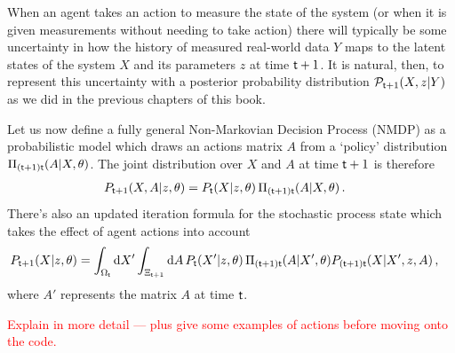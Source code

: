 When an agent takes an action to measure the state of the system (or when it is given measurements without needing to take action) there will typically be some uncertainty in how the history of measured real-world data $Y$ maps to the latent states of the system $X$ and its parameters $z$ at time ${\sf t}+1$. It is natural, then, to represent this uncertainty with a posterior probability distribution ${\cal P}_{{\sf t}+1}(X,z\vert Y)$ as we did in the previous chapters of this book. 

Let us now define a fully general Non-Markovian Decision Process (NMDP) as a probabilistic model which draws an actions matrix $A$ from a `policy' distribution $\Pi_{({\sf t}+1){\sf t}}(A\vert X,\theta)$. The joint distribution over $X$ and $A$ at time ${\sf t}+1$ is therefore
\begin{align}
P_{{\sf t}+1}(X,A\vert z, \theta ) &= P_{{\sf t}}(X\vert z,\theta ) \,\Pi_{({\sf t}+1){\sf t}}(A\vert X,\theta) \,.
\end{align}
There's also an updated iteration formula for the stochastic process state which takes the effect of agent actions into account
\begin{align}
P_{{\sf t}+1}(X\vert z,\theta ) &= \int_{\Omega_{{\sf t}}}{\rm d}X' \int_{\Xi_{{\sf t}+1}}{\rm d}A \, P_{{\sf t}}(X'\vert z,\theta ) \, \Pi_{({\sf t}+1){\sf t}}(A\vert X',\theta)P_{({\sf t}+1){\sf t}}(X\vert X',z,A)  \,,
\end{align}
where $A'$ represents the matrix $A$ at time ${\sf t}$. 

\textcolor{red}{Explain in more detail --- plus give some examples of actions before moving onto the code.}
